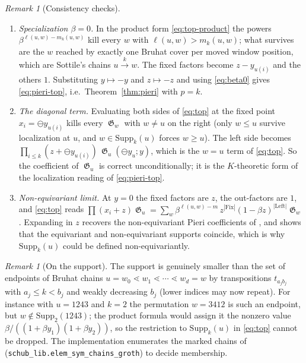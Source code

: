 \documentclass{amsart}
\theoremstyle{definition}
\theoremstyle{remark}
\newtheorem{remark}[theorem]{Remark}
\DeclareMathOperator{\groth}{\mathfrak{G}}
\newcommand{\tom}[1]{\ensuremath{\xrightarrow{#1}}}
\newcommand{\fgn}{\ominus}
\newcommand{\Fix}{\mathrm{Fix}}
\newcommand{\Lft}{\mathrm{Left}}
\newcommand{\Supp}{\mathrm{Supp}}
\newcommand{\pyid}[1]{\texttt{#1}}
\begin{document}
\begin{remark}[Consistency checks]
\begin{enumerate}
\item \emph{Specialization $\beta=0$.} In the product form \eqref{eq:top-product} the powers $\beta^{\ell(u,w)-m_k(u,w)}$ kill every $w$ with
$\ell(u,w) > m_k(u,w)$; what survives are the $w$ reached by exactly one Bruhat cover per moved
window position, which are Sottile's chains $u\tom{k}w$. The fixed factors become $z - y_{u(i)}$ and the others $1$. Substituting
$y\mapsto -y$ and $z\mapsto -z$ and using \eqref{eq:beta0} gives \eqref{eq:pieri-top}, i.e.\
Theorem~\ref{thm:pieri} with $p=k$.
\item \emph{The diagonal term.} Evaluating both sides of \eqref{eq:top} at the fixed point
$x_i=\fgn y_{u(i)}$ kills every $\groth_w$ with $w\ne u$ on the right (only $w\le u$ survive
localization at $u$, and $w\in\Supp_k(u)$ forces $w\ge u$). The left side becomes
$\prod_{i\le k}(z+\fgn y_{u(i)})\,\groth_u(\fgn y_u;y)$, which is the $w=u$ term of
\eqref{eq:top}. So the coefficient of $\groth_u$ is correct unconditionally; it is the
$K$-theoretic form of the localization reading of \eqref{eq:pieri-top}.
\item \emph{Non-equivariant limit.} At $y=0$ the fixed factors are $z$, the out-factors are
$1$, and \eqref{eq:top} reads
$\prod(x_i+z)\groth_u = \sum_w \beta^{\ell(u,w)-m}\,z^{|\Fix|}(1-\beta z)^{|\Lft|}\groth_w$.
Expanding in $z$ recovers the non-equivariant Pieri coefficients of
\cite{lenart2007pieri}, and shows that the equivariant and non-equivariant supports coincide,
which is why $\Supp_k(u)$ could be defined non-equivariantly.
\end{enumerate}
\end{remark}

\begin{remark}[On the support]
The support is genuinely smaller than the set of endpoints of Bruhat chains
$u = w_0 \lessdot w_1 \lessdot \cdots \lessdot w_d = w$ by transpositions $t_{a_jb_j}$ with
$a_j\le k<b_j$ and weakly decreasing $b_j$ (lower indices may now repeat). For instance with
$u=1243$ and $k=2$ the permutation $w=3412$ is such an endpoint, but
$w\notin\Supp_2(1243)$; the product formula would assign it the nonzero value
$\beta/((1+\beta y_1)(1+\beta y_2))$, so the restriction to $\Supp_k(u)$ in \eqref{eq:top}
cannot be dropped. The implementation enumerates the marked chains of \cite{lenart2007pieri}
(\pyid{schub\_lib.elem\_sym\_chains\_groth}) to decide membership.
\end{remark}
\end{document}
